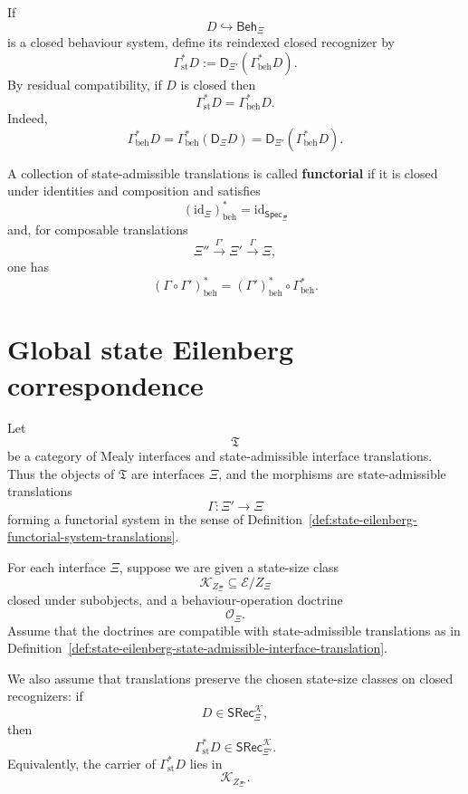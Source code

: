 If
\[
D\hookrightarrow\mathsf{Beh}_\Xi
\]
is a closed behaviour system, define its reindexed closed recognizer by
\[
\Gamma_{\mathrm{st}}^\ast D
:=
\mathsf D_{\Xi'}(\Gamma_{\mathrm{beh}}^\ast D).
\]
By residual compatibility, if \(D\) is closed then
\[
\Gamma_{\mathrm{st}}^\ast D
=
\Gamma_{\mathrm{beh}}^\ast D.
\]
Indeed,
\[
\Gamma_{\mathrm{beh}}^\ast D
=
\Gamma_{\mathrm{beh}}^\ast(\mathsf D_\Xi D)
=
\mathsf D_{\Xi'}(\Gamma_{\mathrm{beh}}^\ast D).
\]

\begin{definition}
\label{def:state-eilenberg-functorial-system-translations}
A collection of state-admissible translations is called \textbf{functorial}
if it is closed under identities and composition and satisfies
\[
(\mathrm{id}_\Xi)_{\mathrm{beh}}^\ast
=
\mathrm{id}_{\mathsf{Spec}_\Xi}
\]
and, for composable translations
\[
\Xi''\xrightarrow{\Gamma'}\Xi'\xrightarrow{\Gamma}\Xi,
\]
one has
\[
(\Gamma\circ\Gamma')_{\mathrm{beh}}^\ast
=
(\Gamma')_{\mathrm{beh}}^\ast\circ \Gamma_{\mathrm{beh}}^\ast.
\]
\end{definition}

\section{Global state Eilenberg correspondence}
\label{sec:state-eilenberg-global-state-correspondence}

Let
\[
\mathfrak T
\]
be a category of Mealy interfaces and state-admissible interface
translations. Thus the objects of \(\mathfrak T\) are interfaces \(\Xi\), and
the morphisms are state-admissible translations
\[
\Gamma:\Xi'\to\Xi
\]
forming a functorial system in the sense of
Definition~\ref{def:state-eilenberg-functorial-system-translations}.

For each interface \(\Xi\), suppose we are given a state-size class
\[
\mathcal K_{Z_\Xi}\subseteq\mathcal E/Z_\Xi
\]
closed under subobjects, and a behaviour-operation doctrine
\[
\mathcal O_\Xi.
\]
Assume that the doctrines are compatible with state-admissible translations
as in
Definition~\ref{def:state-eilenberg-state-admissible-interface-translation}.

We also assume that translations preserve the chosen state-size classes on
closed recognizers: if
\[
D\in\mathsf{SRec}^{\mathcal K}_\Xi,
\]
then
\[
\Gamma_{\mathrm{st}}^\ast D
\in
\mathsf{SRec}^{\mathcal K}_{\Xi'}.
\]
Equivalently, the carrier of \(\Gamma_{\mathrm{st}}^\ast D\) lies in
\[
\mathcal K_{Z_{\Xi'}}.
\]

